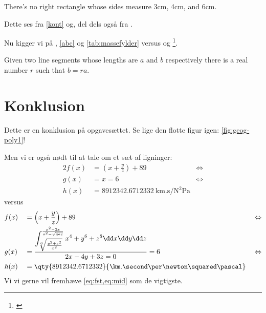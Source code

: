 \documentclass[a4paper, 12pt]{article}
\begin{document}
\begin{korollar}
There's no right rectangle whose sides measure 3cm, 4cm, and 6cm.
\end{korollar}

Dette ses fra \cref{kont} og, del dels også fra .

Nu kigger vi på , \cref{abc} og \cref{tab:massefylder} versus  og \footnote{\cite{greenwade93}}.

\begin{lemma}
Given two line segments whose lengths are \(a\) and \(b\) respectively there is a 
real number \(r\) such that \(b=ra\).
\end{lemma}

\section*{Konklusion}
Dette er en konklusion på opgavesættet. Se lige den flotte figur igen: \cref{fig:geog-poly1}!

Men vi er også nødt til at tale om et sæt af ligninger:
\begin{alignat*}{2}
    f(x) &= \left(x+\frac{y}{z}\right)+89 &\Leftrightarrow \\
    g(x) &= x=6                           &\Leftrightarrow \\
    h(x) &= \qty{8912342.6712332}{\km.\second\per\newton\squared\pascal}
\end{alignat*}
versus
\begin{alignat}{3}
    & f(x) && = \left(x+\frac{y}{z}\right)+89 && \Leftrightarrow\label{eq:fst} \\
    & g(x) && = \frac{\displaystyle\int^\frac{x^2-2x}{a^2-\sqrt{4ac}}_{\sqrt[6]{\frac{y^2+z^2}{x^2}}}x^4+y^6+z^8\dd x\dd y\dd z}{2x-4y+3z=0}=6  && \Leftrightarrow\label{eq:mid} \\
    & h(x) && = \qty{8912342.6712332}{\km.\second\per\newton\squared\pascal}\notag
\end{alignat}
Vi vi gerne vil fremhæve \cref{eq:fst,eq:mid} som de vigtigste.
\label{LastPage} %
\newpage


\end{document}
